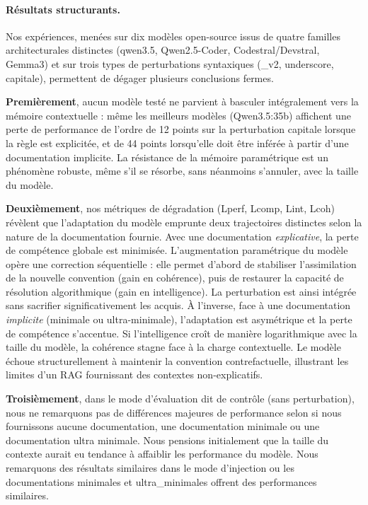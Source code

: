 \documentclass[11pt, a4paper]{article}
\begin{document}
\paragraph{Résultats structurants.}

Nos expériences, menées sur dix modèles open-source issus de quatre familles architecturales distinctes (qwen3.5, Qwen2.5-Coder, Codestral/Devstral, Gemma3) et sur trois types de perturbations syntaxiques (\_v2, underscore, capitale), permettent de dégager plusieurs conclusions fermes.

\textbf{Premièrement}, aucun modèle testé ne parvient à basculer intégralement vers la mémoire contextuelle : même les meilleurs modèles (Qwen3.5:35b) affichent une perte de performance de l'ordre de 12 points sur la perturbation capitale lorsque la règle est explicitée, et de 44 points lorsqu'elle doit être inférée à partir d'une documentation implicite. La résistance de la mémoire paramétrique est un phénomène robuste, même s'il se résorbe, sans néanmoins s'annuler, avec la taille du modèle.

\textbf{Deuxièmement}, nos métriques de dégradation (Lperf​, Lcomp​, Lint​, Lcoh​) révèlent que l'adaptation du modèle emprunte deux trajectoires distinctes selon la nature de la documentation fournie. Avec une documentation \textit{explicative}, la perte de compétence globale est minimisée. L'augmentation paramétrique du modèle opère une correction séquentielle : elle permet d'abord de stabiliser l'assimilation de la nouvelle convention (gain en cohérence), puis de restaurer la capacité de résolution algorithmique (gain en intelligence). La perturbation est ainsi intégrée sans sacrifier significativement les acquis. À l'inverse, face à une documentation \textit{implicite} (minimale ou ultra-minimale), l'adaptation est asymétrique et la perte de compétence s'accentue. Si l'intelligence croît de manière logarithmique avec la taille du modèle, la cohérence stagne face à la charge contextuelle. Le modèle échoue structurellement à maintenir la convention contrefactuelle, illustrant les limites d'un RAG fournissant des contextes non-explicatifs.

\textbf{Troisièmement}, dans le mode d'évaluation dit de contrôle (sans perturbation), nous ne remarquons pas de différences majeures de performance selon si nous fournissons aucune documentation, une documentation minimale ou une documentation ultra minimale. Nous pensions initialement que la taille du contexte aurait eu tendance à affaiblir les performance du modèle. Nous remarquons des résultats similaires dans le mode d'injection ou les documentations minimales et ultra\_minimales offrent des performances similaires.
\end{document}
